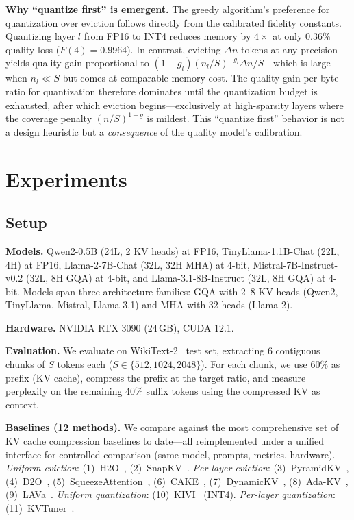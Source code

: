 \documentclass{article}
\begin{document}
\textbf{Why ``quantize first'' is emergent.}
The greedy algorithm's preference for quantization over eviction follows directly from the calibrated fidelity constants.
Quantizing layer $l$ from FP16 to INT4 reduces memory by $4\times$ at only $0.36\%$ quality loss ($F(4) = 0.9964$).
In contrast, evicting $\Delta n$ tokens at any precision yields quality gain proportional to $(1-g_l)(n_l/S)^{-g_l} \Delta n / S$---which is large when $n_l \ll S$ but comes at comparable memory cost.
The quality-gain-per-byte ratio for quantization therefore dominates until the quantization budget is exhausted, after which eviction begins---exclusively at high-sparsity layers where the coverage penalty $(n/S)^{1-g}$ is mildest.
This ``quantize first'' behavior is not a design heuristic but a \emph{consequence} of the quality model's calibration.

\section{Experiments}
\label{sec:experiments}

\subsection{Setup}

\textbf{Models.}
Qwen2-0.5B (24L, 2 KV heads) at FP16,
TinyLlama-1.1B-Chat (22L, 4H) at FP16, Llama-2-7B-Chat (32L, 32H MHA) at 4-bit, Mistral-7B-Instruct-v0.2 (32L, 8H GQA) at 4-bit, and Llama-3.1-8B-Instruct (32L, 8H GQA) at 4-bit.
Models span three architecture families: GQA with 2--8 KV heads (Qwen2, TinyLlama, Mistral, Llama-3.1) and MHA with 32 heads (Llama-2).

\textbf{Hardware.}
NVIDIA RTX 3090 (24\,GB), CUDA 12.1.

\textbf{Evaluation.}
We evaluate on WikiText-2~\citep{merity2017wikitext} test set, extracting 6 contiguous chunks of $S$ tokens each ($S \in \{512, 1024, 2048\}$).
For each chunk, we use 60\% as prefix (KV cache), compress the prefix at the target ratio, and measure perplexity on the remaining 40\% suffix tokens using the compressed KV as context.

\textbf{Baselines (12 methods).}
We compare against the most comprehensive set of KV cache compression baselines to date—all reimplemented under a unified interface for controlled comparison (same model, prompts, metrics, hardware).
\textit{Uniform eviction}: (1)~H2O~\citep{zhang2024h2o}, (2)~SnapKV~\citep{snapkv2024}.
\textit{Per-layer eviction}: (3)~PyramidKV~\citep{pyramidkv2024}, (4)~D2O~\citep{d2o2025}, (5)~SqueezeAttention~\citep{squeezeattention2025}, (6)~CAKE~\citep{cake2025}, (7)~DynamicKV~\citep{dynamickv2024}, (8)~Ada-KV~\citep{adakv2025}, (9)~LAVa~\citep{lava2025}.
\textit{Uniform quantization}: (10)~KIVI~\citep{liu2024kivi} (INT4).
\textit{Per-layer quantization}: (11)~KVTuner~\citep{kvtuner2025}.
\end{document}
